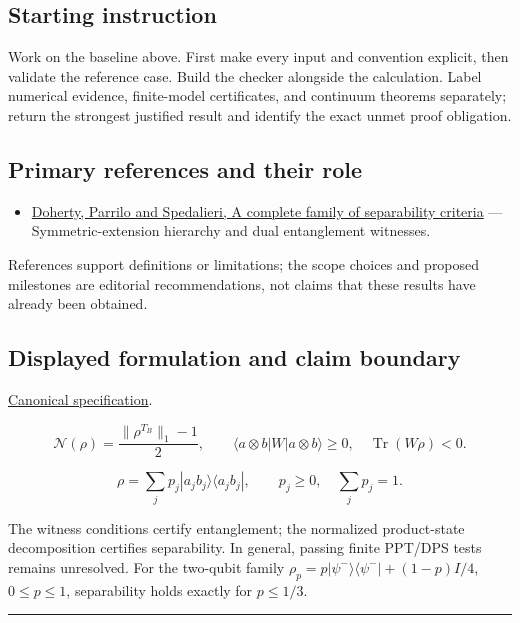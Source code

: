 \documentclass[
  11pt,
]{article}
\providecommand{\tightlist}{%
  \setlength{\itemsep}{0pt}\setlength{\parskip}{0pt}}
\begin{document}
\subsection{Starting instruction}

Work on the baseline above. First make every input and convention
explicit, then validate the reference case. Build the checker alongside
the calculation. Label numerical evidence, finite-model certificates,
and continuum theorems separately; return the strongest justified result
and identify the exact unmet proof obligation.

\subsection{Primary references and their role}

\begin{itemize}
\tightlist
\item
  \href{https://arxiv.org/abs/quant-ph/0308032}{Doherty, Parrilo and
  Spedalieri, A complete family of separability criteria} ---
  Symmetric-extension hierarchy and dual entanglement witnesses.
\end{itemize}

References support definitions or limitations; the scope choices and
proposed milestones are editorial recommendations, not claims that these
results have already been obtained.

\subsection{Displayed formulation and claim boundary}

\href{https://github.com/rick-stevens-ai/Pure-Thought/blob/main/PRDs/23-Entanglement-Measures-Witnesses.md}{Canonical
specification}.

\[\mathcal N(\rho)=\frac{\|\rho^{T_B}\|_1-1}{2},\qquad
\langle a\otimes b|W|a\otimes b\rangle\ge0,\quad \operatorname{Tr}(W\rho)<0.\]

\[\rho=\sum_jp_j|a_jb_j\rangle\langle a_jb_j|,
\qquad p_j\ge0,\quad\sum_jp_j=1.\]

The witness conditions certify entanglement; the normalized
product-state decomposition certifies separability. In general, passing
finite PPT/DPS tests remains unresolved. For the two-qubit family
\(\rho_p=p|\psi^-\rangle\langle\psi^-|+(1-p)I/4\), \(0\le p\le1\),
separability holds exactly for \(p\le1/3\).

\begin{center}\rule{0.5\linewidth}{0.5pt}\end{center}
\end{document}
